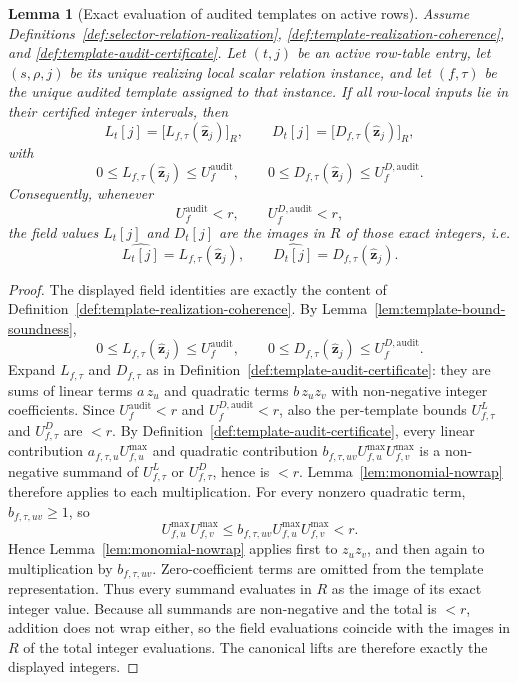 ﻿\documentclass[11pt]{article}
\newtheorem{lemma}[theorem]{Lemma}
\newcommand{\wt}[1]{\widehat{#1}}
\begin{document}
\begin{lemma}[Exact evaluation of audited templates on active rows]
\label{lem:exact-audited-template-evaluation}
Assume Definitions~\ref{def:selector-relation-realization},
\ref{def:template-realization-coherence}, and
\ref{def:template-audit-certificate}. Let \((t,j)\) be an active row-table
entry, let \((s,\rho,j)\) be its unique realizing local scalar relation
instance, and let \((f,\tau)\) be the unique audited template assigned to that
instance. If all row-local inputs lie in their certified integer intervals, then
\[
L_t[j]
=
\bigl[L_{f,\tau}(\wt{\mathbf z}_j)\bigr]_R,
\qquad
D_t[j]
=
\bigl[D_{f,\tau}(\wt{\mathbf z}_j)\bigr]_R,
\]
with
\[
0\le L_{f,\tau}(\wt{\mathbf z}_j)\le U_f^{\mathrm{audit}},
\qquad
0\le D_{f,\tau}(\wt{\mathbf z}_j)\le U_f^{D,\mathrm{audit}}.
\]
Consequently, whenever
\[
U_f^{\mathrm{audit}}<r,
\qquad
U_f^{D,\mathrm{audit}}<r,
\]
the field values \(L_t[j]\) and \(D_t[j]\) are the images in \(R\) of those
exact integers, i.e.
\[
\wt{L_t[j]} = L_{f,\tau}(\wt{\mathbf z}_j),
\qquad
\wt{D_t[j]} = D_{f,\tau}(\wt{\mathbf z}_j).
\]
\end{lemma}

\begin{proof}
The displayed field identities are exactly the content of
Definition~\ref{def:template-realization-coherence}. By
Lemma~\ref{lem:template-bound-soundness},
\[
0\le L_{f,\tau}(\wt{\mathbf z}_j)\le U_f^{\mathrm{audit}},
\qquad
0\le D_{f,\tau}(\wt{\mathbf z}_j)\le U_f^{D,\mathrm{audit}}.
\]
Expand \(L_{f,\tau}\) and \(D_{f,\tau}\) as in
Definition~\ref{def:template-audit-certificate}: they are sums of linear terms
\(a\,z_u\) and quadratic terms \(b\,z_u z_v\) with non-negative integer
coefficients. Since \(U_f^{\mathrm{audit}}<r\) and \(U_f^{D,\mathrm{audit}}<r\),
also the per-template bounds \(U_{f,\tau}^{L}\) and \(U_{f,\tau}^{D}\) are
\(<r\). By Definition~\ref{def:template-audit-certificate}, every linear
contribution \(a_{f,\tau,u}U_{f,u}^{\max}\) and quadratic contribution
\(b_{f,\tau,uv}U_{f,u}^{\max}U_{f,v}^{\max}\) is a non-negative summand of
\(U_{f,\tau}^{L}\) or \(U_{f,\tau}^{D}\), hence is \(<r\). Lemma~\ref{lem:monomial-nowrap}
therefore applies to each multiplication. For every nonzero quadratic term,
\(b_{f,\tau,uv}\ge 1\), so
\[
U_{f,u}^{\max}U_{f,v}^{\max}
\le
b_{f,\tau,uv}U_{f,u}^{\max}U_{f,v}^{\max}
<
r.
\]
Hence Lemma~\ref{lem:monomial-nowrap} applies first to \(z_u z_v\), and then
again to multiplication by \(b_{f,\tau,uv}\). Zero-coefficient terms are
omitted from the template representation. Thus every summand evaluates in \(R\)
as the image of its exact integer value. Because all summands are non-negative
and the total is \(<r\), addition does not wrap either, so the field evaluations
coincide with the images in \(R\) of the total integer evaluations. The
canonical lifts are therefore exactly the displayed integers.
\end{proof}
\end{document}
